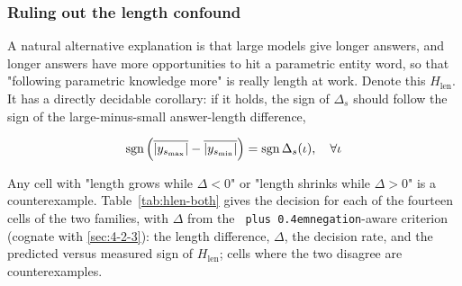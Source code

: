 \documentclass[pdflatex,sn-basic,Numbered]{sn-jnl}
\theoremstyle{thmstyleone}
\theoremstyle{thmstyletwo}
\theoremstyle{thmstylethree}
\DeclareRobustCommand{\code}[1]{\texttt{\spaceskip=0pt plus 0.4em\relax#1}}
\begin{document}
\subsubsection{Ruling out the length confound}
\label{sec:4-2-4}

A natural alternative explanation is that large models give longer answers, and longer answers
have more opportunities to hit a parametric entity word, so that "following parametric
knowledge more" is really length at work. Denote this $H_{\text{len}}$. It has a directly
decidable corollary: if it holds, the sign of $\Delta_s$ should follow the sign of the
large-minus-small answer-length difference,

\begin{equation*}
  \resizebox{\ifdim\width>\linewidth \linewidth\else\width\fi}{!}{$\displaystyle \text{sgn}\left(\overline{|y_{s_{\max}}|} - \overline{|y_{s_{\min}}|}\right) = \text{sgn}\,\Delta_s(\iota), \quad \forall \iota$}
\end{equation*}

Any cell with "length grows while $\Delta < 0$" or "length shrinks while $\Delta > 0$" is a
counterexample. Table~\ref{tab:hlen-both} gives the decision for each of the fourteen cells of
the two families, with $\Delta$ from the \code{negation}-aware criterion (cognate with \ref{sec:4-2-3}): the
length difference, $\Delta$, the decision rate, and the predicted versus measured sign of
$H_{\text{len}}$; cells where the two disagree are counterexamples.
\end{document}
